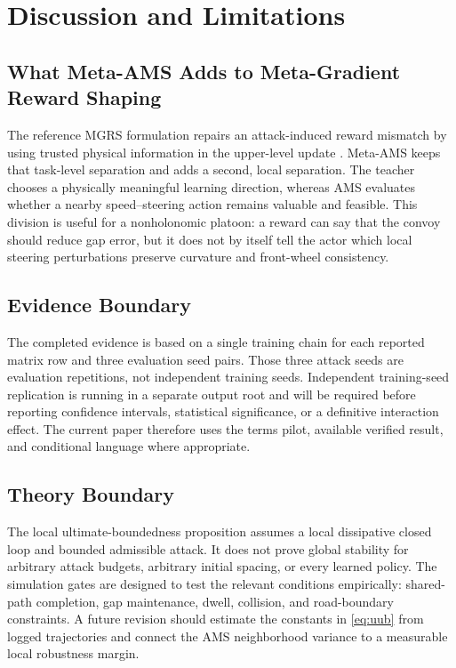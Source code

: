 \documentclass[lettersize,journal]{IEEEtran}
\begin{document}
\section{Discussion and Limitations}
\subsection{What Meta-AMS Adds to Meta-Gradient Reward Shaping}
The reference MGRS formulation repairs an attack-induced reward mismatch by using trusted physical information in the upper-level update \cite{xia2026security}. Meta-AMS keeps that task-level separation and adds a second, local separation. The teacher chooses a physically meaningful learning direction, whereas AMS evaluates whether a nearby speed--steering action remains valuable and feasible. This division is useful for a nonholonomic platoon: a reward can say that the convoy should reduce gap error, but it does not by itself tell the actor which local steering perturbations preserve curvature and front-wheel consistency.

\subsection{Evidence Boundary}
The completed evidence is based on a single training chain for each reported matrix row and three evaluation seed pairs. Those three attack seeds are evaluation repetitions, not independent training seeds. Independent training-seed replication is running in a separate output root and will be required before reporting confidence intervals, statistical significance, or a definitive interaction effect. The current paper therefore uses the terms pilot, available verified result, and conditional language where appropriate.

\subsection{Theory Boundary}
The local ultimate-boundedness proposition assumes a local dissipative closed loop and bounded admissible attack. It does not prove global stability for arbitrary attack budgets, arbitrary initial spacing, or every learned policy. The simulation gates are designed to test the relevant conditions empirically: shared-path completion, gap maintenance, dwell, collision, and road-boundary constraints. A future revision should estimate the constants in \eqref{eq:uub} from logged trajectories and connect the AMS neighborhood variance to a measurable local robustness margin.
\end{document}
